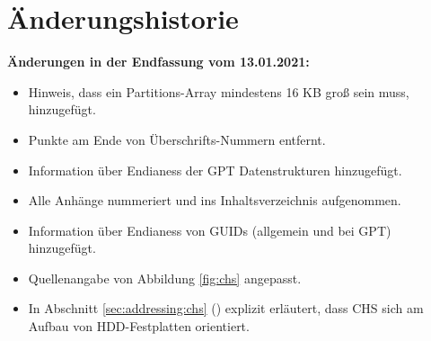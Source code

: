 \section{Änderungshistorie}

\textbf{Änderungen in der Endfassung vom 13.01.2021:}

\begin{itemize}
    \item Hinweis, dass ein Partitions-Array mindestens 16 KB groß sein muss, hinzugefügt.

    \item Punkte am Ende von Überschrifts-Nummern entfernt.

    \item Information über Endianess der GPT Datenstrukturen hinzugefügt.
    
    \item Alle Anhänge nummeriert und ins Inhaltsverzeichnis aufgenommen.
    
    \item Information über Endianess von GUIDs (allgemein und bei GPT) hinzugefügt.
    
    \item Quellenangabe von Abbildung \ref{fig:chs} angepasst.
    
    \item In Abschnitt \ref{sec:addressing:chs} () explizit erläutert, dass CHS sich am Aufbau von HDD-Festplatten orientiert.
\end{itemize}

